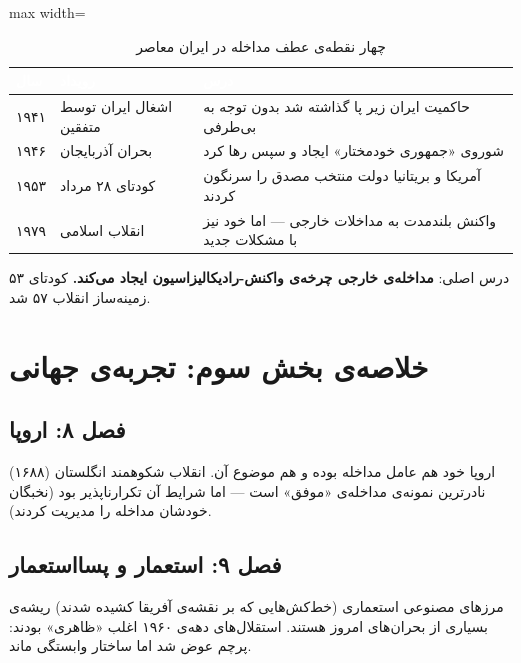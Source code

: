 \begin{table}[htbp]
\centering
\caption{چهار نقطه‌ی عطف مداخله در ایران معاصر}
\label{tab:app-a-iran-modern}
\begin{adjustbox}{max width=\linewidth}
\begin{tabularx}{\linewidth}{>{\centering\arraybackslash}p{1.5cm} >{\raggedleft\arraybackslash}p{3.5cm} >{\raggedleft\arraybackslash}X}
\toprule
\rowcolor{PrimaryDeep}
\textcolor{white}{\textbf{سال}} & \textcolor{white}{\textbf{رویداد}} & \textcolor{white}{\textbf{درس}} \\
\midrule
۱۹۴۱ & اشغال ایران توسط متفقین & حاکمیت ایران زیر پا گذاشته شد بدون توجه به بی‌طرفی \\
\rowcolor{NeutralLight}
۱۹۴۶ & بحران آذربایجان & شوروی «جمهوری خودمختار» ایجاد و سپس رها کرد \\
۱۹۵۳ & کودتای ۲۸ مرداد & آمریکا و بریتانیا دولت منتخب مصدق را سرنگون کردند \\
\rowcolor{NeutralLight}
۱۹۷۹ & انقلاب اسلامی & واکنش بلندمدت به مداخلات خارجی — اما خود نیز با مشکلات جدید \\
\bottomrule
\end{tabularx}
\end{adjustbox}
\end{table}

درس اصلی: \textbf{مداخله‌ی خارجی چرخه‌ی واکنش-رادیکالیزاسیون ایجاد می‌کند.} کودتای ۵۳ زمینه‌ساز انقلاب ۵۷ شد.


\section{خلاصه‌ی بخش سوم: تجربه‌ی جهانی}
\label{sec:app-a-part3}

\subsection{فصل ۸: اروپا}
اروپا خود هم عامل مداخله بوده و هم موضوع آن. انقلاب شکوهمند انگلستان (۱۶۸۸) نادرترین نمونه‌ی مداخله‌ی «موفق» است — اما شرایط آن تکرارناپذیر بود (نخبگان خودشان مداخله را مدیریت کردند).

\subsection{فصل ۹: استعمار و پسااستعمار}
مرزهای مصنوعی استعماری (خط‌کش‌هایی که بر نقشه‌ی آفریقا کشیده شدند) ریشه‌ی بسیاری از بحران‌های امروز هستند. استقلال‌های دهه‌ی ۱۹۶۰ اغلب «ظاهری» بودند: پرچم عوض شد اما ساختار وابستگی ماند.

